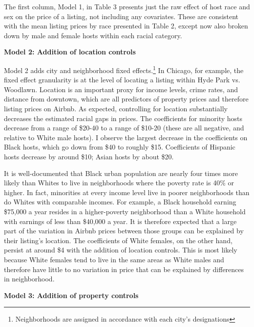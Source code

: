 \documentclass[11pt, oneside]{article}
\begin{document}
The first column, Model 1, in Table 3 presents just the raw effect of host race and sex on the price of a listing, not including any covariates. These are consistent with the mean listing prices by race presented in Table 2, except now also broken down by male and female hosts within each racial category.

\textbf{Model 2: Addition of location controls}

Model 2 adds city and neighborhood fixed effects.\footnote{Neighborhoods are assigned in accordance with each city's designations} In Chicago, for example, the fixed effect granularity is at the level of locating a listing within Hyde Park vs. Woodlawn. Location is an important proxy for income levels, crime rates, and distance from downtown, which are all predictors of property prices and therefore listing prices on Airbnb. As expected, controlling for location substantially decreases the estimated racial gaps in prices. The coefficients for minority hosts decrease from a range of \$20-40 to a range of \$10-20 (these are all negative, and relative to White male hosts). I observe the largest decrease in the coefficients on Black hosts, which go down from \$40 to roughly \$15. Coefficients of Hispanic hosts decrease by around \$10; Asian hosts by about \$20. 

It is well-documented that Black urban population are nearly four times more likely than Whites to live in neighborhoods where the poverty rate is 40\% or higher.\cite{firebaugh} In fact, minorities at every income level live in poorer neighborhoods than do Whites with comparable incomes. For example, a Black household earning \$75,000 a year resides in a higher-poverty neighborhood than a White household with earnings of less than \$40,000 a year.\cite{logan} It is therefore expected that a large part of the variation in Airbnb prices between those groups can be explained by their listing's location. The coefficients of White females, on the other hand, persist at around \$4 with the addition of location controls. This is most likely because White females tend to live in the same areas as White males and therefore have little to no variation in price that can be explained by differences in neighborhood.  

\textbf{Model 3: Addition of property controls}
\end{document}
